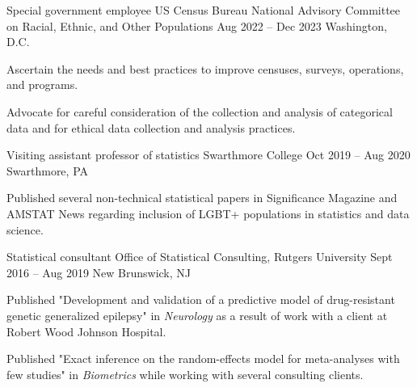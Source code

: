 \documentclass[letterpaper]{resume_config}
\begin{document}
\WorkExperience
    {Special government employee} %
    {US Census Bureau National Advisory Committee on Racial, Ethnic, and Other Populations} %
    {Aug 2022 -- Dec 2023} %
    {Washington, D.C.} %
    {
        \item Ascertain the needs and best practices to improve censuses, surveys, operations, and programs. 
        \item Advocate for careful consideration of the collection and analysis of categorical data and for ethical data collection and analysis practices. 
    } 


\WorkExperience
    {Visiting assistant professor of statistics} %
    {Swarthmore College} %
    {Oct 2019 -- Aug 2020} %
    {Swarthmore, PA} %
    {
        \item Published several non-technical statistical papers in Significance Magazine and AMSTAT News regarding inclusion of LGBT+ populations in statistics and data science.
    } 


\WorkExperience
    {Statistical consultant} %
    {Office of Statistical Consulting, Rutgers University} %
    {Sept 2016 -- Aug 2019} %
    {New Brunswick, NJ} %
    {
        \item Published "Development and validation of a predictive model of drug-resistant genetic generalized epilepsy" in {\it Neurology} as a result of work with a client at Robert Wood Johnson Hospital. 
        \item Published "Exact inference on the random-effects model for meta-analyses with few studies" in {\it Biometrics} while working with several consulting clients. 
    } 
\end{document}
